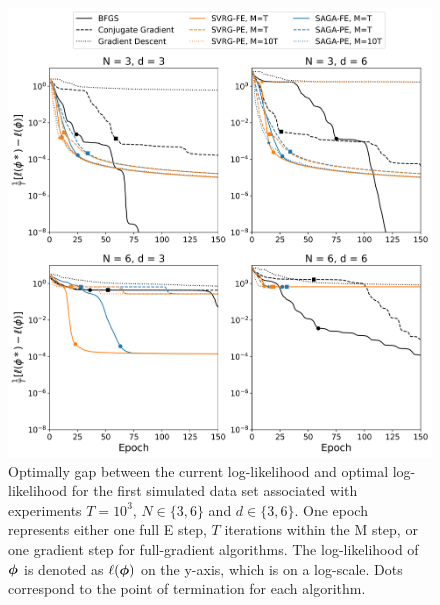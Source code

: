 \documentclass[12pt]{article}
\begin{document}
\newpage

\begin{figure}[H]
    \centering
    \includegraphics[width=6.5in]{../plt/log-like_v_epoch_T-1000-000.png}
    \caption{Optimally gap between the current log-likelihood and optimal log-likelihood for the first simulated data set associated with experiments $T=10^{3}$, $N \in \{3,6\}$ and $d \in \{3,6\}$. One epoch represents either one full E step, $T$ iterations within the M step, or one gradient step for full-gradient algorithms. The log-likelihood of $\boldsymbol{\phi}$ is denoted as $\ell(\boldsymbol{\phi})$ on the y-axis, which is on a log-scale. Dots correspond to the point of termination for each algorithm.}
\end{figure}
%
\end{document}
